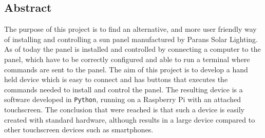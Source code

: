 \documentclass[a4paper]{article}
\begin{document}
    \subsection*{Abstract} %
    \label{sub:abstract}
            The purpose of this project is to find an alternative, and more 
            user friendly way of installing and controlling a sun panel manufactured by Parans Solar Lighting. As of today the panel is installed and controlled by connecting a computer to the panel, which have to be correctly configured and able to run a terminal where commands are sent to the panel. The aim of this project is to develop a hand held device which is easy to connect and has buttons that executes the commands needed to install and control the panel. The resulting device is a software developed in \texttt{Python}, running on a Raspberry Pi with an attached touchscreen.  The conclusion that were reached is that such a device is easily created with standard hardware, although results in a large device compared to other touchscreen devices such as smartphones.

    
\end{document}
